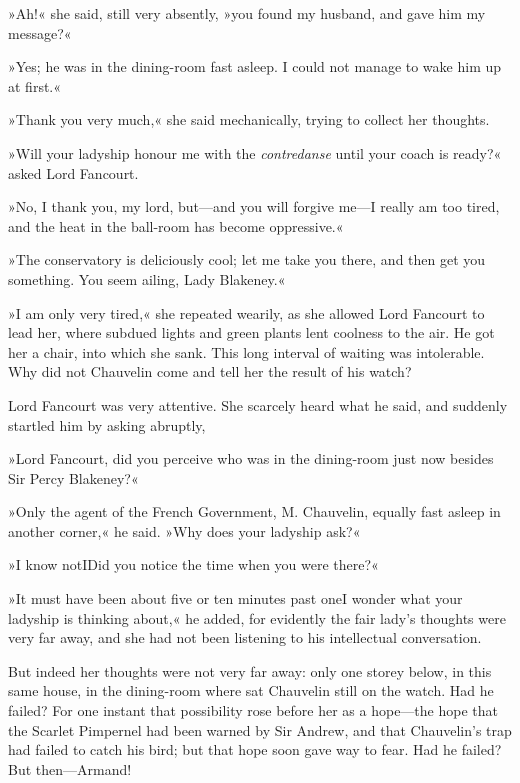 »Ah!« she said, still very absently, »you found my husband, and gave him my message?«

»Yes; he was in the dining-room fast asleep. I could not manage to wake him up at first.«

»Thank you very much,« she said mechanically, trying to collect her thoughts.

»Will your ladyship honour me with the \textit{contredanse} until your coach is ready?« asked Lord Fancourt.

»No, I thank you, my lord, but—and you will forgive me—I really am too tired, and the heat in the ball-room has become oppressive.«

»The conservatory is deliciously cool; let me take you there, and then get you something. You seem ailing, Lady Blakeney.«

»I am only very tired,« she repeated wearily, as she allowed Lord Fancourt to lead her, where subdued lights and green plants lent coolness to the air. He got her a chair, into which she sank. This long interval of waiting was intolerable. Why did not Chauvelin come and tell her the result of his watch?

Lord Fancourt was very attentive. She scarcely heard what he said, and suddenly startled him by asking abruptly,\longdash


»Lord Fancourt, did you perceive who was in the dining-room just now besides Sir Percy Blakeney?«

»Only the agent of the French Government, M. Chauvelin, equally fast asleep in another corner,« he said. »Why does your ladyship ask?«

»I know not\textellipsis \allowbreak  I\textellipsis \allowbreak  Did you notice the time when you were there?«

»It must have been about five or ten minutes past one\textellipsis \allowbreak  I wonder what your ladyship is thinking about,« he added, for evidently the fair lady's thoughts were very far away, and she had not been listening to his intellectual conversation.

But indeed her thoughts were not very far away: only one storey below, in this same house, in the dining-room where sat Chauvelin still on the watch. Had he failed? For one instant that possibility rose before her as a hope—the hope that the Scarlet Pimpernel had been warned by Sir Andrew, and that Chauvelin's trap had failed to catch his bird; but that hope soon gave way to fear. Had he failed? But then—Armand!

